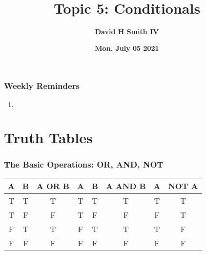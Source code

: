 \documentclass{beamer}
\title{\textbf{Topic 5: Conditionals}}
\author{\textbf{David H Smith IV}}
\institute[\textbf{UIUC}]{\textbf{University of Illinois Urbana-Champaign}}
\date{\textbf{Mon, July 05 2021}}
\begin{document}
\frame{\titlepage}

%
%
\begin{frame}
	\frametitle{Weekly Reminders}
	\begin{enumerate}[A]
		\item 
	\end{enumerate}
\end{frame}

\section{Truth Tables}

%
%
\begin{frame}[fragile]
	\frametitle{The Basic Operations: OR, AND, NOT}
	\centering

	\begin{table}[]
		\begin{tabular}{|ccc|ccc|cc|}
			{\color[HTML]{CD9934} \textbf{A}} & {\color[HTML]{3531FF} \textbf{B}} & \textbf{A OR B} & {\color[HTML]{CD9934} \textbf{A}} & {\color[HTML]{3531FF} \textbf{B}} & \textbf{A AND B} & {\color[HTML]{CD9934} \textbf{A}} & \textbf{NOT A} \\ \hline
			{\color[HTML]{CD9934} T}          & {\color[HTML]{3531FF} T}          & T               & {\color[HTML]{CD9934} T}          & {\color[HTML]{3531FF} T}          & T                & {\color[HTML]{CD9934} T}          & T              \\
			{\color[HTML]{CD9934} T}          & {\color[HTML]{3531FF} F}          & F               & {\color[HTML]{CD9934} T}          & {\color[HTML]{3531FF} F}          & F                & {\color[HTML]{CD9934} F}          & T              \\
			{\color[HTML]{CD9934} F}          & {\color[HTML]{3531FF} T}          & T               & {\color[HTML]{CD9934} F}          & {\color[HTML]{3531FF} T}          & T                & {\color[HTML]{CD9934} T}          & F              \\
			{\color[HTML]{CD9934} F}          & {\color[HTML]{3531FF} F}          & F               & {\color[HTML]{CD9934} F}          & {\color[HTML]{3531FF} F}          & F                & {\color[HTML]{CD9934} F}          & F             
		\end{tabular}
	\end{table}
\end{frame}
\end{document}
